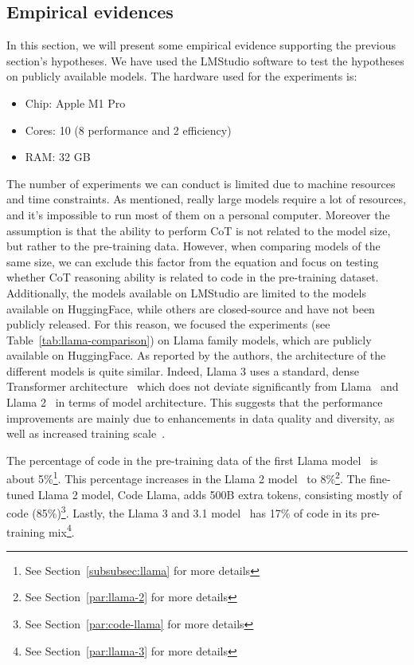 \subsection{Empirical evidences}
\label{sec:empirical-evidence}

In this section, we will present some empirical evidence supporting the previous section's hypotheses.
We have used the LMStudio\cite{lmstudio} software to test the hypotheses on publicly available models.
The hardware used for the experiments is:
\begin{itemize}
	\item Chip: Apple M1 Pro
	\item Cores: 10 (8 performance and 2 efficiency)
	\item RAM: 32 GB
\end{itemize}

The number of experiments we can conduct is limited due to machine resources and time constraints.
As mentioned, really large models require a lot of resources, and it's impossible to run most of them on a personal computer.
Moreover the assumption is that the ability to perform CoT is not related to the model size, but rather to the pre-training data.
However, when comparing models of the same size, we can exclude this factor from the equation and focus on testing whether CoT reasoning ability is related to code in the pre-training dataset.
Additionally, the models available on LMStudio are limited to the models available on HuggingFace, while others are closed-source and have not been publicly released.
For this reason, we focused the experiments (see Table~\ref{tab:llama-comparison}) on Llama family models, which are publicly available on HuggingFace.
As reported by the authors, the architecture of the different models is quite similar.
Indeed, Llama 3 uses a standard, dense Transformer architecture~\cite{vaswani2023attention} which does not deviate significantly from Llama~\cite{touvron2023llama} and Llama 2~\cite{touvron2023llama2} in terms of model architecture.
This suggests that the performance improvements are mainly due to enhancements in data quality and diversity, as well as increased training scale~\cite{llama3}.

The percentage of code in the pre-training data of the first Llama model~\cite{touvron2023llama} is about 5\%\footnote{See Section~\ref{subsubsec:llama} for more details}.
This percentage increases in the Llama 2 model~\cite{touvron2023llama2} to 8\%\footnote{See Section~\ref{par:llama-2} for more details}.
The fine-tuned Llama 2 model, Code Llama\cite{roziere2024codellamaopenfoundation}, adds 500B extra tokens, consisting mostly of code (85\%)\footnote{See Section~\ref{par:code-llama} for more details}.
Lastly, the Llama 3 and 3.1 model~\cite{llama3} has 17\% of code in its pre-training mix\footnote{See Section~\ref{par:llama-3} for more details}.

